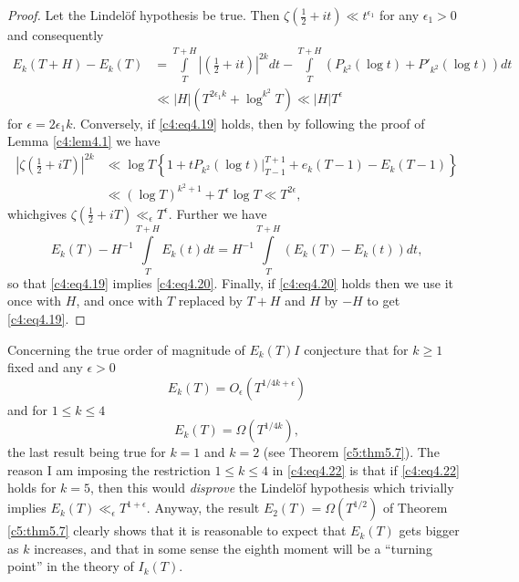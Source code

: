 \begin{proof}
  Let the Lindel\"of hypothesis be true. Then $\zeta (\frac{1}{2} +
  it)\ll t^{\epsilon_1}$ for any $\epsilon_1 >0$ and consequently
{\fontsize{10pt}{12pt}\selectfont
  \begin{align*}
    E_k (T+H) - E_k (T) & = \int\limits_T^{T+H} \left|
    \left(\frac{1}{2} + it \right) \right|^{2k} dt -
    \int\limits_T^{T+H} \left(P_{k^2} (\log t) + P'_{k^2} (\log t)\right) dt\\
    & \ll |H| \left(T^{2 \epsilon_1 k} + \log^{k^2} T \right) \ll |H|T^\epsilon
  \end{align*}}
  for $\epsilon = 2 \epsilon_1 k$. Conversely, if \eqref{c4:eq4.19}
  holds, then by following the proof of Lemma \ref{c4:lem4.1} we have
  \begin{align*}
    \left|\zeta\left(\frac{1}{2} + iT \right)\right|^{2k} & \ll \log T
    \left\{1+ t P_{k^2} (\log t) \Bigg|_{T-1}^{T+1} + e_k (T-1) - E_k
    (T-1) \right\}\\
    & \ll (\log T)^{k^2+1} + T^\epsilon \log T \ll T^{2 \epsilon},
  \end{align*}
which\pageoriginale gives $\zeta (\frac{1}{2} + iT) \ll_\epsilon
T^\epsilon$. Further we have
$$
E_k (T) - H^{-1} \int\limits_T^{T+H} E_k (t) dt = H^{-1}
\int\limits_T^{T+H} \left(E_k (T) - E_k (t)\right)dt,
$$
so that \eqref{c4:eq4.19} implies \eqref{c4:eq4.20}. Finally, if
\eqref{c4:eq4.20} holds then we use it once with $H$, and once with
$T$ replaced by $T+ H$ and $H$ by $-H$ to get \eqref{c4:eq4.19}. 
\end{proof}

Concerning the true order of magnitude of $E_k(T)I$ conjecture that
for $k \geq 1$ fixed and any $\epsilon > 0$
\begin{equation}
  E_k (T) = O_\epsilon (T^{1/4 k+\epsilon}) \label{c4:eq4.21}
\end{equation}
and for $1 \leq k \leq 4$
\begin{equation}
  E_k (T) = \Omega (T^{1/4k}),\label{c4:eq4.22}
\end{equation}
the last result being true for $k=1$ and $k=2$ (see Theorem
\ref{c5:thm5.7}). The reason I am imposing the restriction $1 \leq k
\leq 4$ in \eqref{c4:eq4.22} is that if \eqref{c4:eq4.22} holds for
$k=5$, then this would \textit{disprove} the Lindel\"of hypothesis
which trivially implies $E_k (T) \ll_\epsilon T^{1+
  \epsilon}$. Anyway, the result $E_2(T) = \Omega(T^{1/2})$ of Theorem
\ref{c5:thm5.7} clearly shows that it is reasonable to expect that
$E_k(T)$ gets bigger as $k$ increases, and that in some sense the
eighth moment will be a ``turning point'' in the theory of $I_k(T)$.

